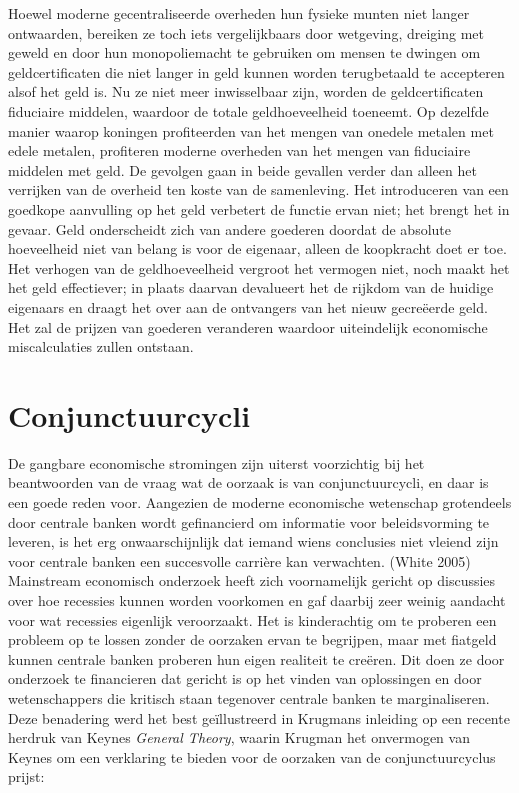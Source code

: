 \documentclass[
  a5paper,
  smalldemyvopaper,11pt,twoside,onecolumn,openright,extrafontsizes,
hidelinks]{memoir}
\begin{document}
Hoewel moderne gecentraliseerde overheden hun fysieke munten niet langer
ontwaarden, bereiken ze toch iets vergelijkbaars door wetgeving,
dreiging met geweld en door hun monopoliemacht te gebruiken om mensen te
dwingen om geldcertificaten die niet langer in geld kunnen worden
terugbetaald te accepteren alsof het geld is. Nu ze niet meer
inwisselbaar zijn, worden de geldcertificaten fiduciaire middelen,
waardoor de totale geldhoeveelheid toeneemt. Op dezelfde manier waarop
koningen profiteerden van het mengen van onedele metalen met edele
metalen, profiteren moderne overheden van het mengen van fiduciaire
middelen met geld. De gevolgen gaan in beide gevallen verder dan alleen
het verrijken van de overheid ten koste van de samenleving. Het
introduceren van een goedkope aanvulling op het geld verbetert de
functie ervan niet; het brengt het in gevaar. Geld onderscheidt zich van
andere goederen doordat de absolute hoeveelheid niet van belang is voor
de eigenaar, alleen de koopkracht doet er toe. Het verhogen van de
geldhoeveelheid vergroot het vermogen niet, noch maakt het het geld
effectiever; in plaats daarvan devalueert het de rijkdom van de huidige
eigenaars en draagt het over aan de ontvangers van het nieuw gecreëerde
geld. Het zal de prijzen van goederen veranderen waardoor uiteindelijk
economische miscalculaties zullen ontstaan.

\section{Conjunctuurcycli}\label{conjunctuurcycli}

De gangbare economische stromingen zijn uiterst voorzichtig bij het
beantwoorden van de vraag wat de oorzaak is van conjunctuurcycli, en
daar is een goede reden voor. Aangezien de moderne economische
wetenschap grotendeels door centrale banken wordt gefinancierd om
informatie voor beleidsvorming te leveren, is het erg onwaarschijnlijk
dat iemand wiens conclusies niet vleiend zijn voor centrale banken een
succesvolle carrière kan verwachten. (White 2005) Mainstream economisch
onderzoek heeft zich voornamelijk gericht op discussies over hoe
recessies kunnen worden voorkomen en gaf daarbij zeer weinig aandacht
voor wat recessies eigenlijk veroorzaakt. Het is kinderachtig om te
proberen een probleem op te lossen zonder de oorzaken ervan te
begrijpen, maar met fiatgeld kunnen centrale banken proberen hun eigen
realiteit te creëren. Dit doen ze door onderzoek te financieren dat
gericht is op het vinden van oplossingen en door wetenschappers die
kritisch staan tegenover centrale banken te marginaliseren. Deze
benadering werd het best geïllustreerd in Krugmans inleiding op een
recente herdruk van Keynes \emph{General Theory}, waarin Krugman het
onvermogen van Keynes om een verklaring te bieden voor de oorzaken van
de conjunctuurcyclus prijst:
\end{document}
